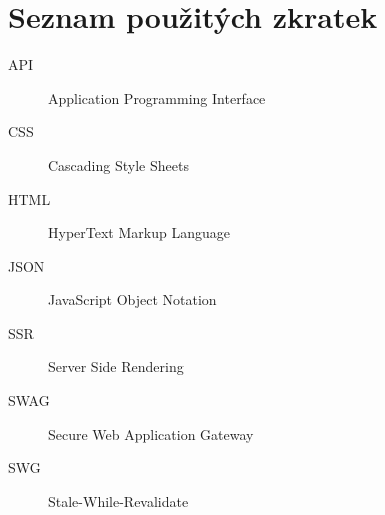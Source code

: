 \chapter{Seznam použitých zkratek}
\begin{description}
	\item[API] Application Programming Interface
	\item[CSS] Cascading Style Sheets   
	\item[HTML] HyperText Markup Language
	\item[JSON] JavaScript Object Notation
	\item[SSR] Server Side Rendering
	\item[SWAG] Secure Web Application Gateway 
	\item[SWG] Stale-While-Revalidate
\end{description}